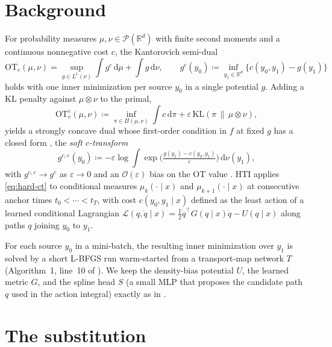 \documentclass[11pt,a4paper]{article}
\newcommand{\R}{\mathbb{R}}
\newcommand{\KL}{\mathrm{KL}}
\newcommand{\OT}{\mathrm{OT}}
\newcommand{\transpose}{^{\!\top}}
\newcommand{\defeq}{\coloneqq}
\begin{document}
\section{Background}
\label{sec:background}

For probability measures $\mu,\nu\in\mathcal{P}(\R^d)$ with finite
second moments and a continuous nonnegative cost $c$, the Kantorovich
semi-dual \citep{villani2008ot}
\begin{equation}
\OT_c(\mu,\nu)=\sup_{g\in L^1(\nu)}\int g^c\,\mathrm{d}\mu
+\int g\,\mathrm{d}\nu,
\qquad
g^c(y_0)\defeq\inf_{y_1\in\R^d}\bigl\{c(y_0,y_1)-g(y_1)\bigr\}
\label{eq:hard-ct}
\end{equation}
holds with one inner minimization per source $y_0$ in a single
potential $g$. Adding a $\KL$ penalty against $\mu\otimes\nu$ to the primal,
\begin{equation}
\OT_c^\varepsilon(\mu,\nu)\defeq
\inf_{\pi\in\Pi(\mu,\nu)} \int c\,\mathrm{d}\pi
+\varepsilon\,\KL(\pi\,\|\,\mu\otimes\nu),
\label{eq:eot-primal}
\end{equation}
yields a strongly concave dual whose first-order condition in $f$ at
fixed $g$ has a closed form
\citep{peyre2019book},
the \emph{soft $c$-transform}
\begin{equation}
g^{c,\varepsilon}(y_0)
\defeq -\varepsilon\log\int
\exp\!\bigl(\tfrac{g(y_1)-c(y_0,y_1)}{\varepsilon}\bigr)\,
\mathrm{d}\nu(y_1),
\label{eq:soft-ct}
\end{equation}
with $g^{c,\varepsilon}\to g^c$ as $\varepsilon\to 0$ and an
$\mathcal{O}(\varepsilon)$ bias on the OT value \citep{pal2024difference}. HTI applies \cref{eq:hard-ct} to conditional measures
$\mu_k(\cdot\mid x)$ and $\mu_{k+1}(\cdot\mid x)$ at consecutive
anchor times $t_0 < \cdots < t_T$, with cost $c(y_0, y_1 \mid x)$
defined as the least action of a learned conditional Lagrangian
$\mathcal{L}(q, \dot q \mid x) = \tfrac12 \dot q\transpose G(q \mid x)
\dot q - U(q \mid x)$ along paths $q$ joining $y_0$ to $y_1$.

\smallskip
For each source $y_0$ in a mini-batch, the resulting inner
minimization over $y_1$ is solved by a short L-BFGS run warm-started
from a transport-map network $T$ (Algorithm~1, line~10 of
\citealt{amad2026hti}). We keep the
density-bias potential $U$, the learned metric $G$, and the spline
head $S$ (a small MLP that proposes the candidate path $q$ used in
the action integral) exactly as in \citet{amad2026hti}.

\section{The substitution}
\label{sec:substitution}
\end{document}

